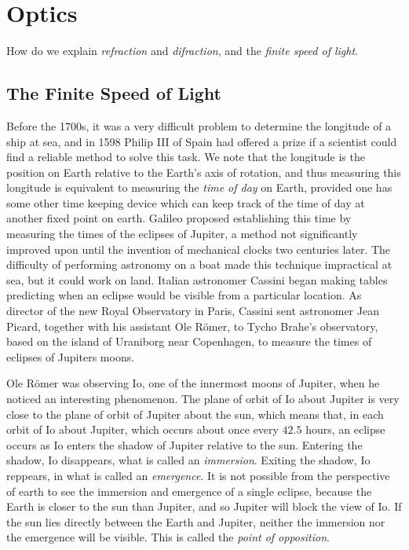 \chapter{Optics}

How do we explain \emph{refraction} and \emph{difraction}, and the \emph{finite speed of light}.

\section{The Finite Speed of Light}

Before the 1700s, it was a very difficult problem to determine the longitude of a ship at sea, and in 1598 Philip III of Spain had offered a prize if a scientist could find a reliable method to solve this task. We note that the longitude is the position on Earth relative to the Earth's axis of rotation, and thus measuring this longitude is equivalent to measuring the \emph{time of day} on Earth, provided one has some other time keeping device which can keep track of the time of day at another fixed point on earth. Galileo proposed establishing this time by measuring the times of the eclipses of Jupiter, a method not significantly improved upon until the invention of mechanical clocks two centuries later. The difficulty of performing astronomy on a boat made this technique impractical at sea, but it could work on land. Italian astronomer Cassini began making tables predicting when an eclipse would be visible from a particular location. As director of the new Royal Observatory in Paris, Cassini sent astronomer Jean Picard, together with his assistant Ole R\"{o}mer, to Tycho Brahe's observatory, based on the island of Uraniborg near Copenhagen, to measure the times of eclipses of Jupiters moons.

Ole R\"{o}mer was observing Io, one of the innermost moons of Jupiter, when he noticed an interesting phenomenon. The plane of orbit of Io about Jupiter is very close to the plane of orbit of Jupiter about the sun, which means that, in each orbit of Io about Jupiter, which occurs about once every $42.5$ hours, an eclipse occurs as Io enters the shadow of Jupiter relative to the sun. Entering the shadow, Io disappears, what is called an \emph{immersion}. Exiting the shadow, Io reppears, in what is called an \emph{emergence}. It is not possible from the perspective of earth to see the immersion and emergence of a single eclipse, because the Earth is closer to the sun than Jupiter, and so Jupiter will block the view of Io. If the sun lies directly between the Earth and Jupiter, neither the immersion nor the emergence will be visible. This is called the \emph{point of opposition}.

